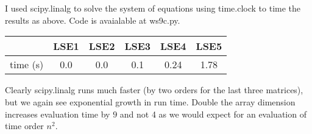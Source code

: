 \documentclass[11pt,letterpaper]{article}
\begin{document}
\section{}

I used scipy.linalg to solve the system of equations using time.clock to time the results as above. Code is avaialable at ws9c.py.

\begin{tabular}{|c|c|c|c|c|c|}
  \hline
& LSE1 & LSE2 & LSE3  & LSE4 & LSE5\\ \hline
time (s) & 0.0 & 0.0 & 0.1& 0.24 & 1.78\\ \hline

\end{tabular}

Clearly scipy.linalg runs much faster (by two orders for the last three matrices), but we again see exponential growth in run time. Double the array dimension increases evaluation time by $9$ and not 4 as we would expect for an evaluation of time order $n^{2}$.
\end{document}
